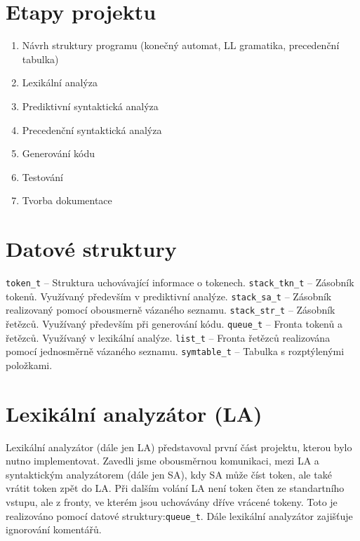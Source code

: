 \documentclass[11pt, a4paper]{article}
\begin{document}
\section{Etapy projektu}
\begin{enumerate}
  \item Návrh struktury programu (konečný automat, LL gramatika, precedenční tabulka)
  \vspace{-0.6em}
  \item Lexikální analýza
  \vspace{-0.6em}
  \item Prediktivní syntaktická analýza 
  \vspace{-0.6em}
  \item Precedenční syntaktická analýza 
  \vspace{-0.6em}
  \item Generování kódu
  \vspace{-0.6em}
  \item Testování
  \vspace{-0.6em}
  \item Tvorba dokumentace
  \vspace{-0.6em}
\end{enumerate}


\section{Datové struktury}
\verb|token_t| -- Struktura uchovávající informace o tokenech. \newline
\verb|stack_tkn_t| -- Zásobník tokenů. Využívaný především v prediktivní analýze. \newline
\verb|stack_sa_t| -- Zásobník realizovaný pomocí obousmerně vázaného seznamu. \newline
\verb|stack_str_t| -- Zásobník řetězců. Využívaný především při generování kódu. \newline
\verb|queue_t| -- Fronta tokenů a řetězců. Využívaný v lexikální analýze.\newline
\verb|list_t| -- Fronta řetězců realizována pomocí jednosměrně vázaného seznamu.\newline
\verb|symtable_t| -- Tabulka s rozptýlenými položkami.\newline


\section{Lexikální analyzátor (LA)}
Lexikální analyzátor (dále jen LA) představoval první část projektu, kterou bylo nutno implementovat. Zavedli jsme obousměrnou komunikaci, mezi LA a syntaktickým analyzátorem (dále jen SA), kdy SA může číst token, ale také vrátit token zpět do LA. Při dalším volání LA není token čten ze standartního vstupu, ale z fronty, ve kterém jsou uchovávány dříve vrácené tokeny. Toto je realizováno pomocí datové struktury:\verb|queue_t|. 
Dále lexikální analyzátor zajišťuje ignorování komentářů. 
\end{document}

